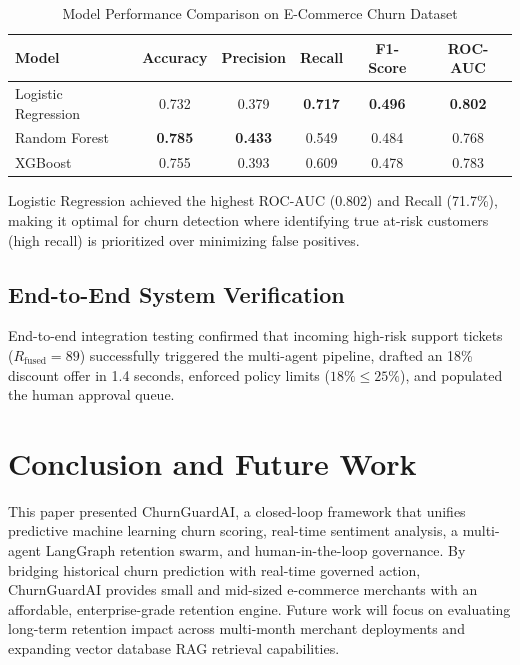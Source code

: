 \documentclass[conference]{IEEEtran}
\begin{document}
\begin{table}[h]
\caption{Model Performance Comparison on E-Commerce Churn Dataset}
\label{tab:models}
\centering
\begin{tabular}{|l|c|c|c|c|c|}
\hline
\textbf{Model} & \textbf{Accuracy} & \textbf{Precision} & \textbf{Recall} & \textbf{F1-Score} & \textbf{ROC-AUC} \\ \hline
Logistic Regression & 0.732 & 0.379 & \textbf{0.717} & \textbf{0.496} & \textbf{0.802} \\ \hline
Random Forest & \textbf{0.785} & \textbf{0.433} & 0.549 & 0.484 & 0.768 \\ \hline
XGBoost & 0.755 & 0.393 & 0.609 & 0.478 & 0.783 \\ \hline
\end{tabular}
\end{table}

Logistic Regression achieved the highest ROC-AUC (0.802) and Recall (71.7\%), making it optimal for churn detection where identifying true at-risk customers (high recall) is prioritized over minimizing false positives.

\subsection{End-to-End System Verification}
End-to-end integration testing confirmed that incoming high-risk support tickets ($R_{\text{fused}} = 89$) successfully triggered the multi-agent pipeline, drafted an 18\% discount offer in 1.4 seconds, enforced policy limits ($18\% \le 25\%$), and populated the human approval queue.

\section{Conclusion and Future Work}
This paper presented ChurnGuardAI, a closed-loop framework that unifies predictive machine learning churn scoring, real-time sentiment analysis, a multi-agent LangGraph retention swarm, and human-in-the-loop governance. By bridging historical churn prediction with real-time governed action, ChurnGuardAI provides small and mid-sized e-commerce merchants with an affordable, enterprise-grade retention engine. Future work will focus on evaluating long-term retention impact across multi-month merchant deployments and expanding vector database RAG retrieval capabilities.
\end{document}
